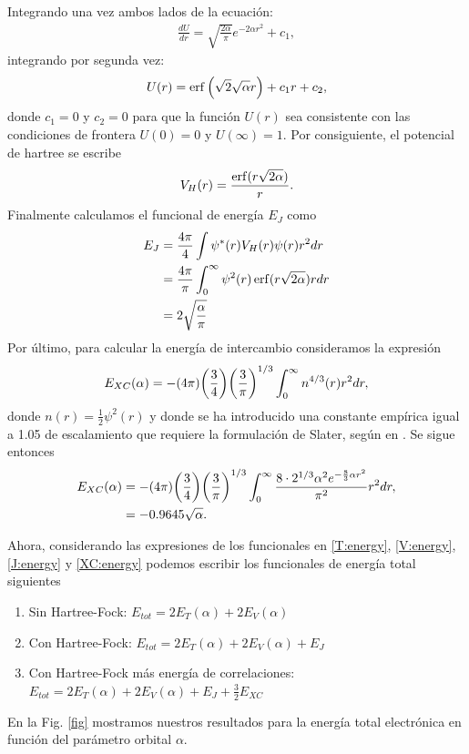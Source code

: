 \documentclass[11pt,letterpaper]{article}
\newcommand{\autores}{\text{Baseden y Tye}}
\begin{document}
Integrando una vez ambos lados de la ecuación:
\begin{align}
\frac{dU}{dr}= \sqrt{\frac{2\alpha}{\pi }} e^{-2 \alpha  r^2}+c_1,
\end{align}
integrando por segunda vez:
\begin{align}
U(r)=\erf\left(\sqrt{2} \sqrt{\alpha } r\right)+c_1r+c_2,
\end{align}
donde $c_1=0$ y $c_2=0$ para que la función $U(r)$ sea consistente con 
las condiciones de frontera $U(0)=0$ y $U(\infty)=1$. Por consiguiente,
el potencial de hartree se escribe
\begin{align}
V_H(r)=\frac{\erf(r\sqrt{2\alpha})}{r}.
\end{align}
Finalmente calculamos el funcional de energía $E_J$ como
\begin{subequations}\label{J:energy}
\begin{align}
E_J&=\frac{4\pi}{4}\int \psi^*(r)V_H(r)\psi(r)r^2dr\\
&=\frac{4\pi}{\pi}\int_0^{\infty} \psi^2(r)\erf(r\sqrt{2\alpha})rdr\\
&=2\sqrt{\frac{\alpha}{\pi}}
\end{align}
\end{subequations}
Por último, para calcular la energía de intercambio consideramos 
la expresión 
\begin{align}
E_{XC}(\alpha)=-\qty(4\pi)\qty(\frac{3}{4})\qty(\frac{3}{\pi})^{1/3}
\int_0^{\infty} n^{4/3}(r)r^2dr,
\end{align}
donde $n(r)=\frac{1}{2}\psi^2(r)$ y donde se ha introducido una constante
empírica igual a 1.05 de escalamiento que requiere la formulación de Slater,
según \autores{} en \cite{baseden2014introduction}. 
Se sigue entonces 
\begin{subequations}\label{XC:energy}
\begin{align}
E_{XC}(\alpha)&=-(4\pi)\qty(\frac{3}{4})\qty(\frac{3}{\pi})^{1/3}
\int_0^{\infty} \frac{8\cdot 2^{1/3}\alpha^2e^{-\frac{8}{3}\alpha r^2}}{\pi^2}r^2dr,\\
&=-0.9645\sqrt{\alpha}.
\end{align}
\end{subequations}

Ahora, considerando las expresiones de los funcionales en 
\eqref{T:energy}, \eqref{V:energy}, \eqref{J:energy} y \eqref{XC:energy}
podemos escribir los funcionales de energía total siguientes
\begin{enumerate}
\item Sin Hartree-Fock: $E_{tot}=2E_T(\alpha)+2E_V(\alpha)$
\item Con Hartree-Fock: $E_{tot}=2E_T(\alpha)+2E_V(\alpha)+E_J$
\item Con Hartree-Fock más energía de correlaciones: $E_{tot}=2E_T(\alpha)+
2E_V(\alpha)+E_J+\frac{3}{2}E_{XC}$
\end{enumerate}
En la Fig. \ref{fig} mostramos nuestros resultados para la 
energía total electrónica en función del parámetro orbital $\alpha$.
\end{document}
